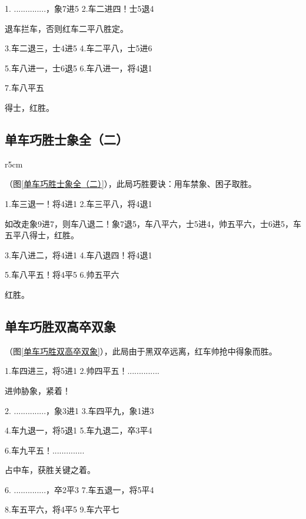\documentclass[UTF8]{ctexbook}
\newcommand{\rc}[2]{\piece{#1}{#2}{r}} \newcommand{\bc}[2]{\piece{#1}{#2}{R}}
\newcommand{\rj}[2]{\piece{#1}{#2}{k}} \newcommand{\bj}[2]{\piece{#1}{#2}{K}}
\begin{document}
1. ..............，象7进5 \qquad 2.车二进四！士5退4

退车拦车，否则红车二平八胜定。

3.车二退三，士4进5 \qquad 4.车二平八，士5进6

5.车八进一，士6退5 \qquad 6.车八进一，将4退1

7.车八平五

得士，红胜。

\subsection{单车巧胜士象全（二）}
\begin{wrapfigure}{r}{5cm}
\centering
\vspace{-1.5cm}
\smallboard
\begin{position}
\rj{e}{1} \rc{g}{9}

\bj{d}{10}    
\end{position}
\caption{}\label{单车巧胜士象全（二）} 
\end{wrapfigure}
（图\ref{单车巧胜士象全（二）}），此局巧胜要诀：用车禁象、困子取胜。

1.车三退一！将4进1 \qquad 2.车三平八，将4退1

如改走象9进7，则车八退二！象7退5，车八平六，士5进4，帅五平六，士6进5，车五平八得士，红胜。

3.车八进二，将4进1 \qquad 4.车八退四！将4退1

5.车八平五！将4平5 \qquad 6.帅五平六

红胜。
\subsection{单车巧胜双高卒双象}
（图\ref{单车巧胜双高卒双象}），此局由于黑双卒远离，红车帅抢中得象而胜。

1.车四进三，将5进1 \qquad 2.帅四平五！..............

进帅胁象，紧着！

2. ..............，象3进1 \qquad 3.车四平九，象1进3

4.车九退一，将5退1 \qquad 5.车九退二，卒3平4

6.车九平五！..............

占中车，获胜关键之着。

6. ..............，卒2平3 \qquad 7.车五退一，将5平4

8.车五平六，将4平5 \qquad 9.车六平七
\end{document}
